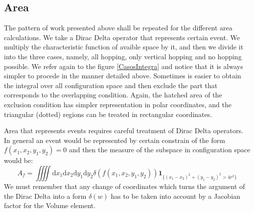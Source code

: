 \documentclass[letterpaper,10pt, jcp, aps]{revtex4-1}
\newcommand{\rd}{\!\mathrm{d}}
\newcommand{\indicator}[1]{\mathbf{1}_{ \{   #1 \} } }
\begin{document}
\subsection{Area}

The pattern of work presented above shall be repeated for the different
area calculations. We take a Dirac Delta operator that represents certain
event. We multiply the characteristic function of avaible space by it, and
then we divide it into the three cases, namely, all hopping, only vertical hopping
and no hopping possible. We refer again to the figure \ref{CasosIntegra} and notice
that it is always simpler to procede in the manner detailed above. Sometimes is
easier to obtain 
the integral  over all configuration space and then exclude the part that
corresponds to the overlapping condition. Again, the hatched area of the exclusion
condition has simpler representation in polar coordinates, and the triangular
(dotted) regions can be treated in rectangular coordinates.



Area that represents events  requires careful treatment of Dirac Delta operators.
In general an event would be represented by certain constrain of the form
$f(x_1, x_2 , y_1,y_2) =0 $ and then the measure of the subspace in configuration
space would be:
\begin{equation}
  A_f=\iiiint \rd x_1  \rd x_2  \rd y_1  \rd y_2 \delta(f(x_1, x_2 , y_1,y_2))
  \indicator{(x_1-x_2)^2+(y_1-y_2)^2>4r^2 }
\end{equation}
We must remember that any change of coordinates which turns the argument
of the Dirac Delta into a form $\delta(w)$ has to be taken into account by
a Jacobian factor for the Volume element. 
\end{document}
